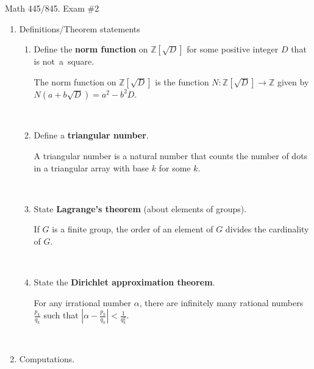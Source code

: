 \documentclass[12pt]{amsart}
\newcommand{\Z}{\mathbb{Z}}
\newcommand{\solution}[1]{\ifthenelse {\equal{\displaysol}{1}} {\begin{framed}{\color{meretale}\noindent #1}\end{framed}} { \ }}
\newcommand{\showsol}[1]{\def\displaysol{#1}}
\begin{document}
\showsol{1}


	\thispagestyle{empty}
	
	\begin{center}
		\Large{Math 445/845. Exam \#2 }\\

	\end{center}
	
	
	
	\bigskip
	
\large


	\begin{enumerate}
		\item Definitions/Theorem statements
		\begin{enumerate}
			\item  Define the \textbf{norm function} on $\Z[\sqrt{D}]$ for some positive integer $D$ that is not~a~square.
		\solution{The norm function on $\Z[\sqrt{D}]$ is the function $N: \Z[\sqrt{D}] \to \Z$ given by $N(a+b\sqrt{D}) = a^2 - b^2 D$.}		
		
		\vfill
		
		\item Define a \textbf{triangular number}.
		
		\solution{A triangular number is a natural number that counts the number of dots in a triangular array with base $k$ for some $k$.
		}
		
		
		\vfill
		
		\item State \textbf{Lagrange's theorem} (about elements of groups).
		
		\solution{If $G$ is a finite group, the order of an element of $G$ divides the cardinality of $G$.
		}
		
		\vfill
		
		\item State the \textbf{Dirichlet approximation theorem}.
				
			\solution{For any irrational number $\alpha$, there are infinitely many rational numbers $\frac{p_k}{q_k}$ such that $\displaystyle\left| \alpha - \frac{p_k}{q_k}\right| <\frac{1}{q_k^2}$.
		}
		
		
		\vfill

\end{enumerate}

\newpage
\item Computations.

\begin{enumerate}


\end{enumerate}
\end{enumerate}
\end{document}
